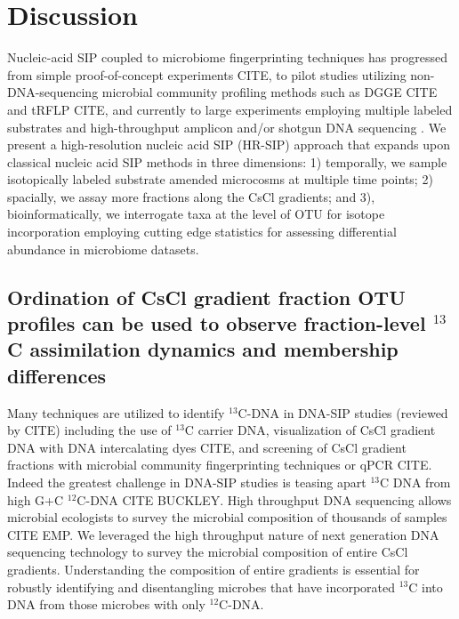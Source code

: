 \section{Discussion}
Nucleic-acid SIP coupled to microbiome fingerprinting techniques has progressed
from simple proof-of-concept experiments  CITE, to pilot studies utilizing
non-DNA-sequencing microbial community profiling methods such as DGGE CITE and
tRFLP CITE, and currently to large experiments employing multiple labeled
substrates and high-throughput amplicon and/or shotgun DNA sequencing
\citep{Verastegui_2014}. We present a high-resolution nucleic acid SIP (HR-SIP)
approach that expands upon classical nucleic acid SIP methods in three
dimensions: 1) temporally, we sample isotopically labeled substrate amended
microcosms at multiple time points; 2) spacially, we assay more fractions along
the CsCl gradients; and 3), bioinformatically, we interrogate taxa at the level
of OTU for isotope incorporation employing cutting edge statistics for
assessing differential abundance in microbiome datasets.

\subsection{Ordination of CsCl gradient fraction OTU profiles can be used to
observe fraction-level $^{13}$C assimilation dynamics and membership differences}
Many techniques are utilized to identify $^{13}$C-DNA in DNA-SIP studies
(reviewed by CITE) including the use of $^{13}$C carrier DNA, visualization of
CsCl gradient DNA with DNA intercalating dyes CITE, and screening of CsCl
gradient fractions with microbial community fingerprinting techniques or qPCR
CITE. Indeed the greatest challenge in DNA-SIP studies is teasing apart $^{13}$C
DNA from high G+C $^{12}$C-DNA CITE BUCKLEY. High throughput DNA sequencing
allows microbial ecologists to survey the microbial composition of thousands of
samples CITE EMP. We leveraged the high throughput nature of next generation
DNA sequencing technology to survey the microbial composition of entire CsCl
gradients.  Understanding the composition of entire gradients is essential for
robustly identifying and disentangling microbes that have incorporated $^{13}$C
into DNA from those microbes with only $^{12}$C-DNA.

